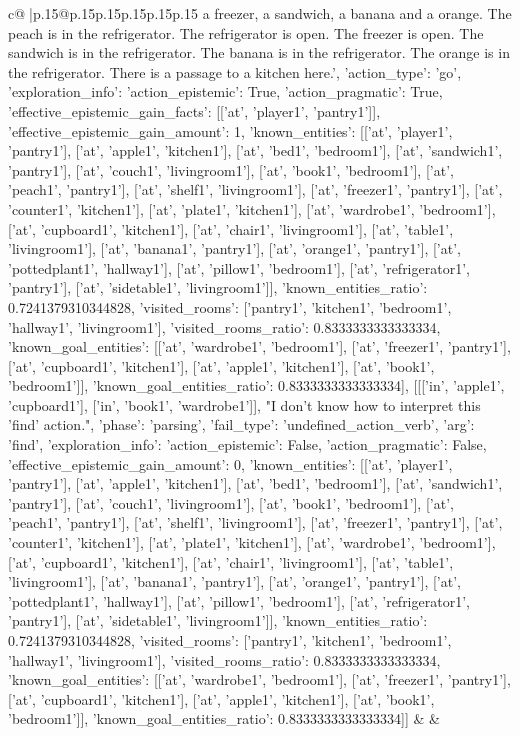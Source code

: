 \documentclass{article}
\begin{document}
{\begin{supertabular}{c@{$\;$}|p{.15\linewidth}@{}p{.15\linewidth}p{.15\linewidth}p{.15\linewidth}p{.15\linewidth}p{.15\linewidth}}
{{{a freezer, a sandwich, a banana and a orange. The peach is in the refrigerator. The refrigerator is open. The freezer is open. The sandwich is in the refrigerator. The banana is in the refrigerator. The orange is in the refrigerator. There is a passage to a kitchen here.', {'action_type': 'go', 'exploration_info': {'action_epistemic': True, 'action_pragmatic': True, 'effective_epistemic_gain_facts': [['at', 'player1', 'pantry1']], 'effective_epistemic_gain_amount': 1, 'known_entities': [['at', 'player1', 'pantry1'], ['at', 'apple1', 'kitchen1'], ['at', 'bed1', 'bedroom1'], ['at', 'sandwich1', 'pantry1'], ['at', 'couch1', 'livingroom1'], ['at', 'book1', 'bedroom1'], ['at', 'peach1', 'pantry1'], ['at', 'shelf1', 'livingroom1'], ['at', 'freezer1', 'pantry1'], ['at', 'counter1', 'kitchen1'], ['at', 'plate1', 'kitchen1'], ['at', 'wardrobe1', 'bedroom1'], ['at', 'cupboard1', 'kitchen1'], ['at', 'chair1', 'livingroom1'], ['at', 'table1', 'livingroom1'], ['at', 'banana1', 'pantry1'], ['at', 'orange1', 'pantry1'], ['at', 'pottedplant1', 'hallway1'], ['at', 'pillow1', 'bedroom1'], ['at', 'refrigerator1', 'pantry1'], ['at', 'sidetable1', 'livingroom1']], 'known_entities_ratio': 0.7241379310344828, 'visited_rooms': ['pantry1', 'kitchen1', 'bedroom1', 'hallway1', 'livingroom1'], 'visited_rooms_ratio': 0.8333333333333334, 'known_goal_entities': [['at', 'wardrobe1', 'bedroom1'], ['at', 'freezer1', 'pantry1'], ['at', 'cupboard1', 'kitchen1'], ['at', 'apple1', 'kitchen1'], ['at', 'book1', 'bedroom1']], 'known_goal_entities_ratio': 0.8333333333333334}}], [[['in', 'apple1', 'cupboard1'], ['in', 'book1', 'wardrobe1']], "I don't know how to interpret this 'find' action.", {'phase': 'parsing', 'fail_type': 'undefined_action_verb', 'arg': 'find', 'exploration_info': {'action_epistemic': False, 'action_pragmatic': False, 'effective_epistemic_gain_amount': 0, 'known_entities': [['at', 'player1', 'pantry1'], ['at', 'apple1', 'kitchen1'], ['at', 'bed1', 'bedroom1'], ['at', 'sandwich1', 'pantry1'], ['at', 'couch1', 'livingroom1'], ['at', 'book1', 'bedroom1'], ['at', 'peach1', 'pantry1'], ['at', 'shelf1', 'livingroom1'], ['at', 'freezer1', 'pantry1'], ['at', 'counter1', 'kitchen1'], ['at', 'plate1', 'kitchen1'], ['at', 'wardrobe1', 'bedroom1'], ['at', 'cupboard1', 'kitchen1'], ['at', 'chair1', 'livingroom1'], ['at', 'table1', 'livingroom1'], ['at', 'banana1', 'pantry1'], ['at', 'orange1', 'pantry1'], ['at', 'pottedplant1', 'hallway1'], ['at', 'pillow1', 'bedroom1'], ['at', 'refrigerator1', 'pantry1'], ['at', 'sidetable1', 'livingroom1']], 'known_entities_ratio': 0.7241379310344828, 'visited_rooms': ['pantry1', 'kitchen1', 'bedroom1', 'hallway1', 'livingroom1'], 'visited_rooms_ratio': 0.8333333333333334, 'known_goal_entities': [['at', 'wardrobe1', 'bedroom1'], ['at', 'freezer1', 'pantry1'], ['at', 'cupboard1', 'kitchen1'], ['at', 'apple1', 'kitchen1'], ['at', 'book1', 'bedroom1']], 'known_goal_entities_ratio': 0.8333333333333334}}]] 
	  } 
	   } 
	   } 
	 & & \\ 
 


\end{supertabular}}
\end{document}
